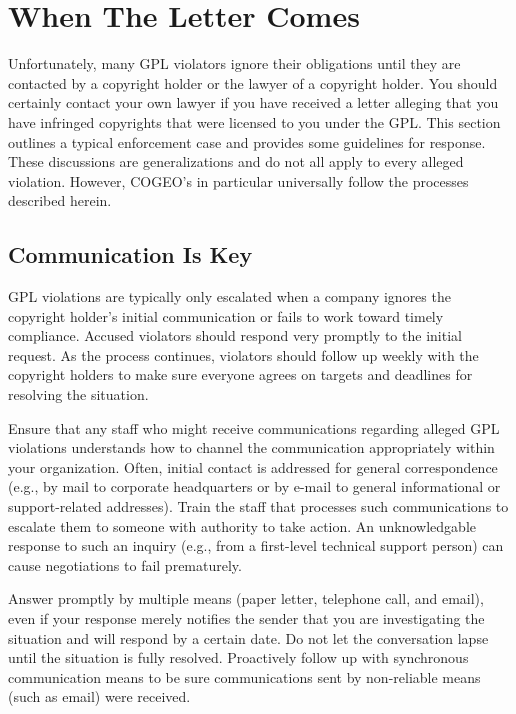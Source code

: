 \chapter{When The Letter Comes}

Unfortunately, many GPL violators ignore their obligations until they are
contacted by a copyright holder or the lawyer of a copyright holder.  You
should certainly contact your own lawyer if you have received a letter
alleging that you have infringed copyrights that were licensed to you
under the GPL\@.  This section outlines a typical enforcement case and
provides some guidelines for response.  These discussions are
generalizations and do not all apply to every alleged violation.  However,
COGEO's in particular universally follow the processes described herein.

\section{Communication Is Key}

GPL violations are typically only escalated when a company ignores the
copyright holder's initial communication or fails to work toward timely
compliance.  Accused violators should respond very promptly to the
initial request.  As the process continues, violators should follow up weekly with the
copyright holders to make sure everyone agrees on targets and deadlines
for resolving the situation.

Ensure that any staff who might receive communications regarding alleged
GPL violations understands how to channel the communication appropriately
within your organization.  Often, initial contact is addressed for general
correspondence (e.g., by mail to corporate headquarters or by e-mail to
general informational or support-related addresses).  Train the staff that
processes such communications to escalate them to someone with authority
to take action.  An unknowledgable response to such an inquiry (e.g., from
a first-level technical support person) can cause negotiations to fail
prematurely.

Answer promptly by multiple means (paper letter, telephone call, and
email), even if your response merely notifies the sender that you are
investigating the situation and will respond by a certain date.  Do not
let the conversation lapse until the situation is fully resolved.
Proactively follow up with synchronous communication means to be sure
communications sent by non-reliable means (such as email) were received.


